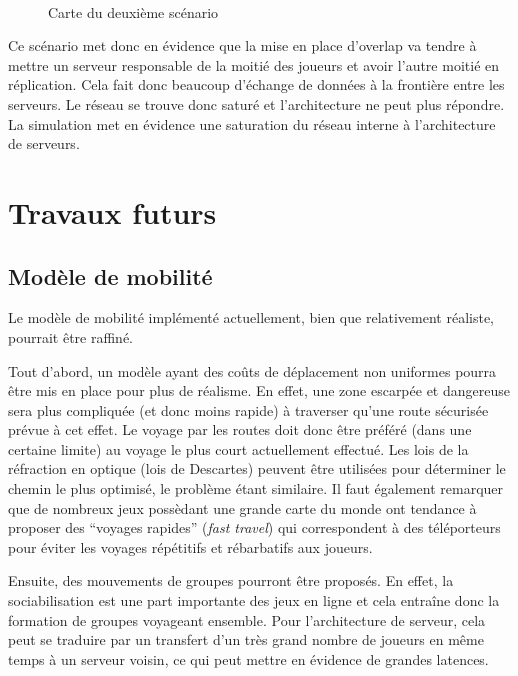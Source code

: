 \begin{figure}[h!]
	\centering
	\\[0.2cm]
	\caption{Carte du deuxième scénario}
	\label{fig:scenario_2}
\end{figure}

Ce scénario met donc en évidence que la mise en place d'overlap va tendre à mettre un serveur responsable de la moitié des joueurs et avoir l'autre moitié en réplication.
Cela fait donc beaucoup d'échange de données à la frontière entre les serveurs.
Le réseau se trouve donc saturé et l'architecture ne peut plus répondre.
La simulation met en évidence une saturation du réseau interne à l'architecture de serveurs.

\section{Travaux futurs}

\subsection{Modèle de mobilité}

Le modèle de mobilité implémenté actuellement, bien que relativement réaliste, pourrait être raffiné.

Tout d'abord, un modèle ayant des coûts de déplacement non uniformes pourra être mis en place pour plus de réalisme.
En effet, une zone escarpée et dangereuse sera plus compliquée (et donc moins rapide) à traverser qu'une route sécurisée prévue à cet effet.
Le voyage par les routes doit donc être préféré (dans une certaine limite) au voyage le plus court actuellement effectué.
Les lois de la réfraction en optique (lois de Descartes) peuvent être utilisées pour déterminer le chemin le plus optimisé, le problème étant similaire.
Il faut également remarquer que de nombreux jeux possèdant une grande carte du monde ont tendance à proposer des ``voyages rapides'' (\textit{fast travel}) qui correspondent à des téléporteurs pour éviter les voyages répétitifs et rébarbatifs aux joueurs.

Ensuite, des mouvements de groupes pourront être proposés.
En effet, la sociabilisation est une part importante des jeux en ligne et cela entraîne donc la formation de groupes voyageant ensemble.
Pour l'architecture de serveur, cela peut se traduire par un transfert d'un très grand nombre de joueurs en même temps à un serveur voisin, ce qui peut mettre en évidence de grandes latences.

